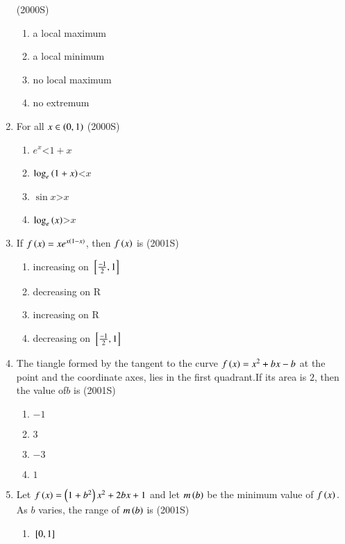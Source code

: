 \documentclass[journal,10pt,twocolumn]{IEEEtran}
\theoremstyle{remark}
\begin{document}
\begin{enumerate}[start=9]
\hfill {(2000S)} \\

\begin{enumerate}
    \item a local maximum
    \item a local minimum
    \item no local maximum
    \item no extremum
\end{enumerate}
\item For all $x \in \left(0,1\right)$ \hfill {(2000S)} \\
\begin{enumerate}
    \item $e^x$\textless$1+x$
    \item $\log_e\left(1+x\right)$\textless $x$
    \item $\sin x$\textgreater $x$
    \item $\log_e\left(x\right)$\textgreater $x$
\end{enumerate}
\item If $f\left(x\right)=xe^{x\left(1-x\right)}$, then $f\left(x\right)$ is \hfill {(2001S)} \\
\begin{enumerate}
    \item increasing on ${}\left[\frac{-1}{2},1\right]$
    \item decreasing on R
    \item increasing on R
    \item decreasing on ${}\left[\frac{-1}{2},1\right]$
\end{enumerate}
\item The tiangle formed by the tangent to the curve $f\left(x\right)=x^2+bx-b$ at the point and the coordinate axes, lies in the first quadrant.If its area is $2$, then the value of$b$ is \hfill {(2001S)} \\
\begin{enumerate}
    \item $-1$
    \item $3$
    \item $-3$
    \item $1$
\end{enumerate}
\item Let $f\left(x\right)=\left(1+b^2\right)x^2+2bx+1$ and let $m\left(b\right)$ be the minimum value of $f\left(x\right).$As $b$ varies, the range of $m\left(b\right)$ is \hfill {(2001S)} \\
\begin{enumerate}
    \item ${}\left[0,1\right]$

\end{enumerate}
\end{enumerate}
\end{document}
